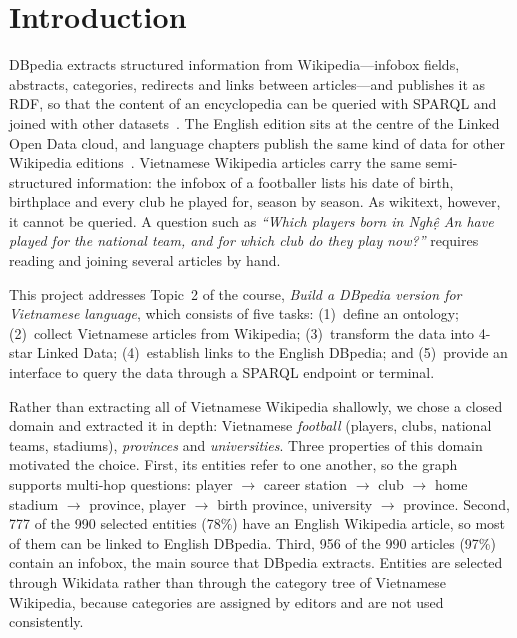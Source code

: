 \section{Introduction}

DBpedia extracts structured information from Wikipedia---infobox fields,
abstracts, categories, redirects and links between articles---and publishes it
as RDF, so that the content of an encyclopedia can be queried with SPARQL and
joined with other datasets~\cite{auer2007dbpedia, lehmann2015dbpedia}. The
English edition sits at the centre of the Linked Open Data cloud, and language
chapters publish the same kind of data for other Wikipedia
editions~\cite{kontokostas2012greek}. Vietnamese Wikipedia articles carry the
same semi-structured information: the infobox of a footballer lists his date of
birth, birthplace and every club he played for, season by season. As wikitext,
however, it cannot be queried. A question such as \emph{``Which players born in
Nghệ An have played for the national team, and for which club do they play
now?''} requires reading and joining several articles by hand.

This project addresses Topic~2 of the course, \emph{Build a DBpedia version for
Vietnamese language}, which consists of five tasks: (1)~define an ontology;
(2)~collect Vietnamese articles from Wikipedia; (3)~transform the data into
4-star Linked Data; (4)~establish links to the English DBpedia; and
(5)~provide an interface to query the data through a SPARQL endpoint or
terminal.

Rather than extracting all of Vietnamese Wikipedia shallowly, we chose a closed
domain and extracted it in depth: Vietnamese \emph{football} (players, clubs,
national teams, stadiums), \emph{provinces} and \emph{universities}. Three
properties of this domain motivated the choice. First, its entities refer to
one another, so the graph supports multi-hop questions: player $\rightarrow$
career station $\rightarrow$ club $\rightarrow$ home stadium $\rightarrow$
province, player $\rightarrow$ birth province, university $\rightarrow$
province. Second, 777 of the 990 selected entities (78\%) have an English
Wikipedia article, so most of them can be linked to English DBpedia. Third,
956 of the 990 articles (97\%) contain an infobox, the main source that DBpedia
extracts. Entities are selected through Wikidata rather than through the
category tree of Vietnamese Wikipedia, because categories are assigned by
editors and are not used consistently.

